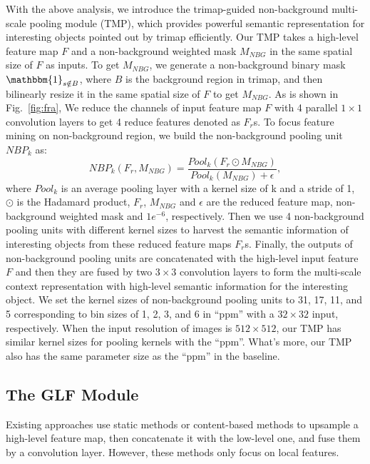 \documentclass[10pt,twocolumn,letterpaper]{article}
\begin{document}
With the above analysis, we  introduce the trimap-guided non-background multi-scale pooling module (TMP), which provides powerful semantic representation for interesting objects pointed out by trimap efficiently. Our TMP takes a high-level feature map $F$ and a non-background weighted mask $M_{NBG}$ in the same spatial size of $F$ as inputs. To get $M_{NBG}$, we generate a non-background binary mask  $\mathbbm{1}_{s \notin B}$, where $B$ is the background region in trimap, and then bilinearly resize it  in  the same spatial size of $F$ to get  $M_{NBG}$. As is shown in Fig.~\ref{fig:fra}, We reduce the channels of input feature map $F$ with 4 parallel $1\times 1$ convolution layers to get 4 reduce features denoted as $F_r$s. To focus feature mining on non-background region, we build the non-background pooling unit $NBP_k$ as:
\begin{equation}
	NBP_k(F_r,M_{NBG}) =  \frac{Pool_{k}(F_r\odot M_{NBG})}{Pool_{k}(M_{NBG})+\epsilon} ,
	\label{uint}
\end{equation}
where $Pool_k$ is an average pooling layer with a kernel size of  k and a stride of 1, $\odot$ is the Hadamard product, $F_r$, $M_{NBG}$ and $\epsilon$  are the reduced feature map, non-background weighted mask and $1e^{-6}$, respectively. Then we use 4  non-background pooling units with different kernel sizes to harvest the semantic information of interesting objects from these reduced feature maps $F_r$s. Finally, the outputs of non-background pooling units are concatenated with the high-level input feature $F$ and then they are fused by two $3\times 3$ convolution layers to form the  multi-scale context representation with high-level semantic information for the interesting object. We set the kernel sizes of non-background pooling units to 31, 17, 11, and 5 corresponding to bin sizes of 1, 2, 3, and 6 in  ``ppm'' with a $32\times 32 $ input, respectively. When the input resolution of images is $512\times 512$, our TMP has similar kernel sizes for pooling kernels  with the ``ppm''. What's more, our TMP also has the same parameter size as the ``ppm'' in  the baseline. 





\subsection{The GLF Module}
Existing approaches use static methods \cite{fba,gca}  or content-based  methods \cite{carafe,a2u} to upsample a high-level feature map, then concatenate it with the low-level one, and fuse them by a convolution layer. However, these methods only focus  on  local features. 
\end{document}
